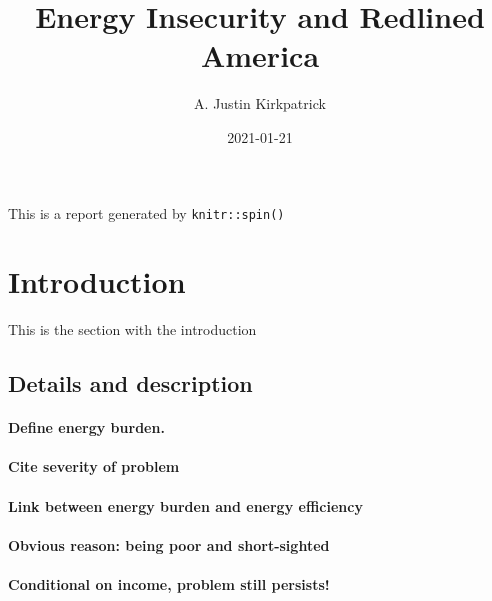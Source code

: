 \documentclass[
]{article}
\title{Energy Insecurity and Redlined America}
\author{A. Justin Kirkpatrick}
\date{2021-01-21}
\begin{document}
\maketitle

This is a report generated by \texttt{knitr::spin()}

\hypertarget{introduction}{%
\section{Introduction}\label{introduction}}

This is the section with the introduction

\hypertarget{details-and-description}{%
\subsection{Details and description}\label{details-and-description}}

\hypertarget{define-energy-burden.}{%
\paragraph{Define energy burden.}\label{define-energy-burden.}}

\hypertarget{cite-severity-of-problem}{%
\paragraph{Cite severity of problem}\label{cite-severity-of-problem}}

\hypertarget{link-between-energy-burden-and-energy-efficiency}{%
\paragraph{Link between energy burden and energy
efficiency}\label{link-between-energy-burden-and-energy-efficiency}}

\hypertarget{obvious-reason-being-poor-and-short-sighted}{%
\paragraph{Obvious reason: being poor and
short-sighted}\label{obvious-reason-being-poor-and-short-sighted}}

\hypertarget{conditional-on-income-problem-still-persists}{%
\paragraph{Conditional on income, problem still
persists!}\label{conditional-on-income-problem-still-persists}}
\end{document}
